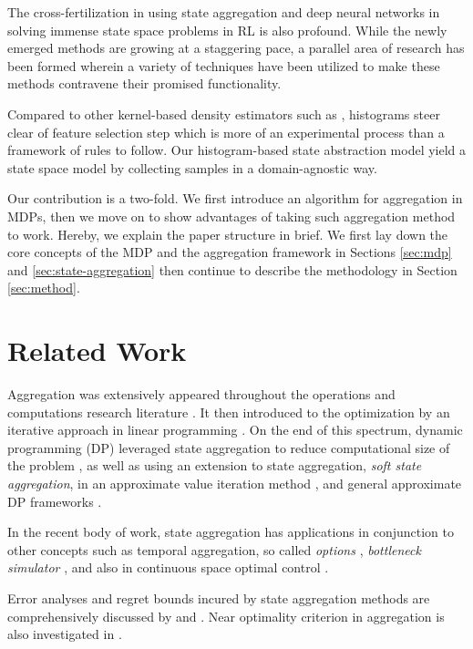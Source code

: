 \documentclass{article}
\begin{document}
    The cross-fertilization in using state aggregation and deep neural networks in solving immense state
    space problems in RL is also profound.
    While the newly emerged methods are growing at a staggering pace, a parallel area of research has been formed
    wherein a variety of techniques have been utilized to make these methods contravene their promised functionality.

    Compared to other kernel-based density estimators such as \citep{HongLim2019}, histograms steer clear of feature
    selection step which is more of an experimental process than a framework of rules to follow.
    Our histogram-based state abstraction model yield a state space model by collecting samples in a domain-agnostic
    way.

    Our contribution is a two-fold.
    We first introduce an algorithm for aggregation in MDPs, then we move on to show advantages of taking such
    aggregation method to work.
    Hereby, we explain the paper structure in brief.
    We first lay down the core concepts of the MDP and the aggregation framework in Sections \ref{sec:mdp} and
    \ref{sec:state-aggregation} then continue to describe the methodology in Section \ref{sec:method}.


\section{Related Work}
    \label{sec:related-work}
    Aggregation was extensively appeared throughout the operations and computations research literature
    \cite{Chatelin1982, Rogers1991, Douglas1993}.
    It then introduced to the optimization by an iterative approach in linear programming \cite{Mendelssohn1982}.
    On the end of this spectrum, dynamic programming (DP) leveraged state aggregation to reduce computational size of
    the problem \cite{Bean1987}, as well as using an extension to state aggregation, \textit{soft state
    aggregation}, in an approximate value iteration method \cite{Singh1995}, and general approximate DP frameworks
    \cite{Gordon1995, Tsitsiklis1996}.

    In the recent body of work, state aggregation has applications in conjunction to other concepts such as
    temporal aggregation, so called \textit{options} \cite{Ciosek2015}, \textit{bottleneck simulator}
    \cite{Serban2018}, and also in continuous space optimal control \cite{Zhong2011}.

    Error analyses and regret bounds incured by state aggregation methods are comprehensively discussed by
    \citet{VanRoy2006} and \citet{Petrik2014}.
    Near optimality criterion in aggregation is also investigated in \citet{Bernstein2008}.
\end{document}
